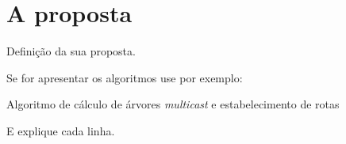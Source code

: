 \chapter{A proposta} \label{cap:prop}

Definição da sua proposta.

Se for apresentar os algoritmos
use por exemplo:

\begin{algorithm} 
	 
	\caption{Algoritmo de cálculo de árvores \textit{multicast} e estabelecimento de rotas} 
	\label{algo:5_multi_tree} 
\end{algorithm}

E explique cada linha.

